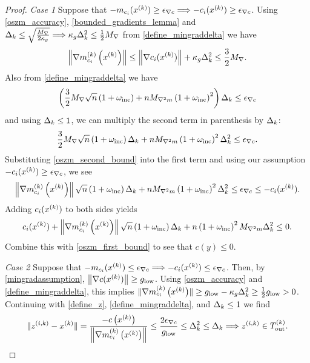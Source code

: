 \begin{proof}
\emph{Case 1}
Suppose that $-m_{c_i}(x^{(k)}) \ge {\epsilon_{\nabla c}} \Longrightarrow -c_i(x^{(k)}) \ge {\epsilon_{\nabla c}}$.
Using \cref{oszm_accuracy}, \cref{bounded_gradients_lemma} and 
$\Delta_k \le \sqrt{\frac {{M_{\nabla}}} {2\kappa_g}} \Longrightarrow \kappa_g \Delta_k^2 \le \frac 1 2 {M_{\nabla}}$ from \cref{define_mingraddelta} we have
\begin{align}
\label{oszm_second_bound}
\left\| {\nabla m_{c_i}^{(k)}\left(x^{(k)}\right)} \right\| \le \left\|\nabla c_i(x^{(k)})\right\| + \kappa_g \Delta_k^2 \le \frac 3 2 {M_{\nabla}}.
\end{align}
Also from \cref{define_mingraddelta} we have
\begin{align*}
\left(\frac 3 2 {M_{\nabla}}\sqrt{n} \left(1 + \omega_{\text{inc}}\right) + n {M_{\nabla^2 m}} \left(1 + \omega_{\text{inc}}\right)^2 \right)\Delta_k \le {\epsilon_{\nabla c}}
\end{align*}
and using $\Delta_k \le 1$, we can multiply the second term in parenthesis by $\Delta_k$:
\begin{align*}
\frac 3 2 {M_{\nabla}}\sqrt{n} \left(1 + \omega_{\text{inc}}\right) \Delta_k + n {M_{\nabla^2 m}} \left(1 + \omega_{\text{inc}}\right)^2\Delta_k^2 \le {\epsilon_{\nabla c}}.
\end{align*}
Substituting \cref{oszm_second_bound} into the first term and using our assumption $-c_i(x^{(k)}) \ge {\epsilon_{\nabla c}}$, we see
\begin{align*}
\left\|{\nabla m_{c_i}^{(k)}\left(x^{(k)}\right)}\right\|\sqrt{n}\left(1 + \omega_{\text{inc}}\right) \Delta_k + n {M_{\nabla^2 m}} \left(1 + \omega_{\text{inc}}\right)^2\Delta_k^2  \le {\epsilon_{\nabla c}} \le -c_i(x^{(k)}).
\end{align*}
Adding $c_i(x^{(k)})$ to both sides yields
\begin{align*}
c_i(x^{(k)}) + \left\|{\nabla m_{c_i}^{(k)}\left(x^{(k)}\right)}\right\|\sqrt{n}\left(1 + \omega_{\text{inc}}\right) \Delta_k + n \left(1 + \omega_{\text{inc}}\right)^2{M_{\nabla^2 m}}\Delta_k^2 \le 0.
\end{align*}
Combine this with \cref{oszm_first_bound} to see that $c(y) \le 0$.


\emph{Case 2}
Suppose that $-m_{c_i}(x^{(k)}) \le {\epsilon_{\nabla c}} \Longrightarrow -c_i(x^{(k)}) \le {\epsilon_{\nabla c}}$.
Then, by \cref{mingradassumption}, 
$\left\|\nabla c(x^{(k)}) \right\| \ge { g_{\textrm{low}} }$.
Using \cref{oszm_accuracy} and \cref{define_mingraddelta}, this implies
$\|{\nabla m_{c_i}^{(k)}\left(x^{(k)}\right)}\| \ge { g_{\textrm{low}} } - \kappa_g \Delta_k^2 \ge \frac 1 2 { g_{\textrm{low}} } > 0$.
Continuing with \cref{define_z}, \cref{define_mingraddelta}, and $\Delta_k \le 1$ we find
\begin{align*}
\|{z^{(i, k)}}-x^{(k)}\| = \frac{-c\left(x^{(k)}\right)}{\left\|{\nabla m_{c_i}^{(k)}\left(x^{(k)}\right)}\right\|} \le \frac{2{\epsilon_{\nabla c}}}{{ g_{\textrm{low}} }}\le \Delta_k^2 \le \Delta_k \Longrightarrow {z^{(i, k)}} \in {T_{\text{out}}^{(k)}}.
\end{align*}
\end{proof}


